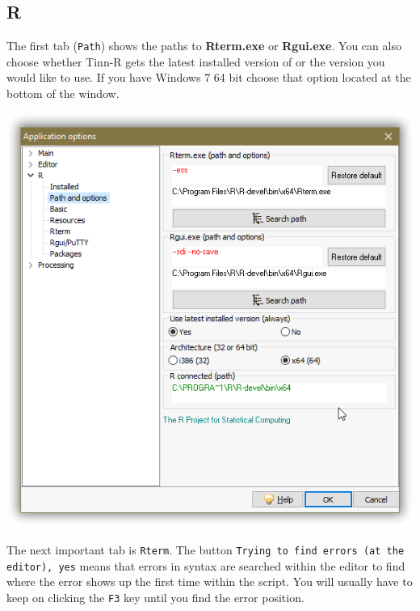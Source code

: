 \subsection{R}

The first tab (\texttt{Path}) shows the paths to \textbf{Rterm.exe} or \textbf{Rgui.exe}.
You can also choose whether Tinn-R gets the latest installed version of \RR{} or the version you would like to use.
If you have Windows 7 64 bit choose that option located at the bottom of the window.

\includegraphics[scale=0.50]{./res/app_r_pathandoptions.png}

The next important tab is \texttt{Rterm}. The button \texttt{Trying to find errors (at the editor), yes}
means that errors in \RR{} syntax are searched within the editor to find where the error shows up the first
time within the script. You will usually have to keep on clicking the \texttt{F3} key until you find the error position.

